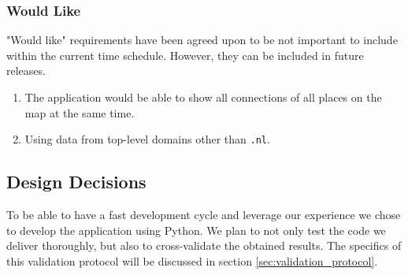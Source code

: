 \subsubsection {Would Like}
"Would like" requirements have been agreed upon to be not important to include within the current time schedule. However, they can be included in future releases.

\begin{enumerate}
    \item The application would be able to show all connections of all places on the map at the same time.
    \item Using data from top-level domains other than \texttt{.nl}.
\end{enumerate}

\subsection{Design Decisions}
To be able to have a fast development cycle and leverage our experience we chose to develop the application using Python. 
We plan to not only test the code we deliver thoroughly, but also to cross-validate the obtained results. The specifics of this validation protocol will be discussed in section \ref{sec:validation_protocol}.